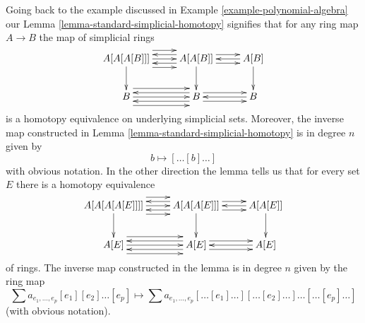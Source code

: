 \begin{example}
\label{example-polynomial-algebra-homotopy}
Going back to the example discussed in
Example \ref{example-polynomial-algebra}
our Lemma \ref{lemma-standard-simplicial-homotopy}
signifies that for any ring map $A \to B$ the map of simplicial rings
$$
\xymatrix{
A[A[A[B]]] \ar[d]
\ar@<2ex>[r]
\ar@<0ex>[r]
\ar@<-2ex>[r]
&
A[A[B]] \ar[d]
\ar@<1ex>[r]
\ar@<-1ex>[r]
\ar@<1ex>[l]
\ar@<-1ex>[l]
&
A[B] \ar[d]
\ar@<0ex>[l] \\
B
\ar@<2ex>[r]
\ar@<0ex>[r]
\ar@<-2ex>[r]
&
B
\ar@<1ex>[r]
\ar@<-1ex>[r]
\ar@<1ex>[l]
\ar@<-1ex>[l]
&
B
\ar@<0ex>[l]
}
$$
is a homotopy equivalence on underlying simplicial sets. Moreover, the inverse
map constructed in Lemma \ref{lemma-standard-simplicial-homotopy}
is in degree $n$ given by
$$
b \longmapsto [\ldots[b]\ldots]
$$
with obvious notation. In the other direction the lemma tells us that
for every set $E$ there is a homotopy equivalence
$$
\xymatrix{
A[A[A[A[E]]]] \ar[d]
\ar@<2ex>[r]
\ar@<0ex>[r]
\ar@<-2ex>[r]
&
A[A[A[E]]] \ar[d]
\ar@<1ex>[r]
\ar@<-1ex>[r]
\ar@<1ex>[l]
\ar@<-1ex>[l]
&
A[A[E]] \ar[d]
\ar@<0ex>[l] \\
A[E]
\ar@<2ex>[r]
\ar@<0ex>[r]
\ar@<-2ex>[r]
&
A[E]
\ar@<1ex>[r]
\ar@<-1ex>[r]
\ar@<1ex>[l]
\ar@<-1ex>[l]
&
A[E]
\ar@<0ex>[l]
}
$$
of rings. The inverse map constructed in the lemma is in degree $n$
given by the ring map
$$
\sum a_{e_1,\ldots,e_p}[e_1][e_2] \ldots [e_p]
\longmapsto
\sum a_{e_1,\ldots,e_p}[\ldots[e_1]\ldots][\ldots[e_2]\ldots]
\ldots [\ldots[e_p]\ldots]
$$
(with obvious notation).
\end{example}

